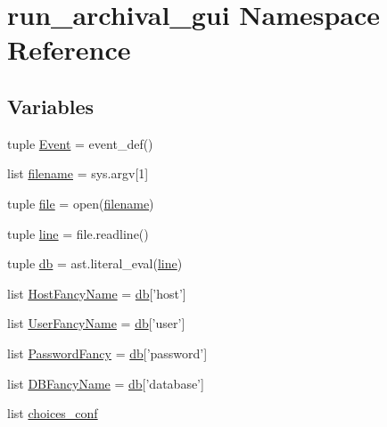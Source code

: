 \hypertarget{namespacerun__archival__gui}{\section{run\-\_\-archival\-\_\-gui Namespace Reference}
\label{namespacerun__archival__gui}
}
\subsection*{Variables}
\begin{DoxyCompactItemize}
\item 
tuple \hyperlink{namespacerun__archival__gui_ae4bf328fca6859457a543a7ff933ccfa}{Event} = event\-\_\-def()
\item 
list \hyperlink{namespacerun__archival__gui_a152f939cb3f2e943a37737fb505c7b7e}{filename} = sys.\-argv\mbox{[}1\mbox{]}
\item 
tuple \hyperlink{namespacerun__archival__gui_a9a26e2184288cff2d81e765003fe7897}{file} = open(\hyperlink{namespacerun__archival__gui_a152f939cb3f2e943a37737fb505c7b7e}{filename})
\item 
tuple \hyperlink{namespacerun__archival__gui_a3008707290c47efb54081330e99bd7f4}{line} = file.\-readline()
\item 
tuple \hyperlink{namespacerun__archival__gui_a243ccc20ff1988a6ee254f1436f1f540}{db} = ast.\-literal\-\_\-eval(\hyperlink{namespacerun__archival__gui_a3008707290c47efb54081330e99bd7f4}{line})
\item 
list \hyperlink{namespacerun__archival__gui_a300818b5e7911daac7a5ffc565ef38bb}{Host\-Fancy\-Name} = \hyperlink{namespacerun__archival__gui_a243ccc20ff1988a6ee254f1436f1f540}{db}\mbox{[}'host'\mbox{]}
\item 
list \hyperlink{namespacerun__archival__gui_aefe12f3665230898e8f53887190a2c43}{User\-Fancy\-Name} = \hyperlink{namespacerun__archival__gui_a243ccc20ff1988a6ee254f1436f1f540}{db}\mbox{[}'user'\mbox{]}
\item 
list \hyperlink{namespacerun__archival__gui_a6ff13b2dcf15748288e82dc02c7f189d}{Password\-Fancy} = \hyperlink{namespacerun__archival__gui_a243ccc20ff1988a6ee254f1436f1f540}{db}\mbox{[}'password'\mbox{]}
\item 
list \hyperlink{namespacerun__archival__gui_af7e6fd62864fd6f9bfa5ef7dff8e20e9}{D\-B\-Fancy\-Name} = \hyperlink{namespacerun__archival__gui_a243ccc20ff1988a6ee254f1436f1f540}{db}\mbox{[}'database'\mbox{]}
\item 
list \hyperlink{namespacerun__archival__gui_aa423912994ac1bddf7fcb25b590089d5}{choices\-\_\-conf}

\end{DoxyCompactItemize}
